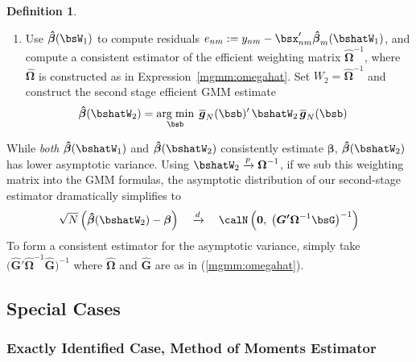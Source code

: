 \documentclass[12pt]{article}
\theoremstyle{plain}
\theoremstyle{definition}
\newtheorem{defn}[thm]{Definition}
\theoremstyle{remark}
\newcommand{\bsbeta}{\boldsymbol{\beta}}
\newcommand{\bshatG}{\boldsymbol{\hat{G}}}
\newcommand{\bsOmega}{\boldsymbol{\Omega}}
\newcommand{\bshatbeta}{\boldsymbol{\hat{\beta}}}
\newcommand{\bshatOmega}{\boldsymbol{\hat{\Omega}}}
\newcommand{\bsbarg}{\boldsymbol{\overline{g}}}
\renewcommand{\bso}{\boldsymbol{0}}
\newcommand{\bsGp}{\boldsymbol{G'}}
\DeclareMathOperator*{\argmin}{arg\;min}
\newcommand{\pto}{\xrightarrow{p}}
\newcommand{\dto}{\xrightarrow{d}}
\newcommand{\sumnN}{\sum^N_{n=1}}
\begin{document}
\begin{defn}
\begin{enumerate}[label=(\roman*)]
  \item Use $\bshatbeta(\bsW_1)$ to compute residuals
    $e_{nm} := y_{nm} - \bsx_{nm}'\bshatbeta_m(\bshatW_1)$,
    and compute a consistent estimator of the efficient weighting matrix
    $\bshatOmega^{-1}$, where $\bshatOmega$ is
    constructed as in Expression~\ref{mgmm:omegahat}.
    Set $W_2=\bshatOmega^{-1}$ and construct the second stage efficient
    GMM estimate
    \begin{alignat*}{3}
      \bshatbeta(\bshatW_2) &=
      \argmin_{\bsb}\;
      \bsbarg_N(\bsb)' \, \bshatW_2 \, \bsbarg_N(\bsb)
    \end{alignat*}
\end{enumerate}
While \emph{both} $\bshatbeta(\bshatW_1)$ and $\bshatbeta(\bshatW_2)$
consistently estimate $\bsbeta$, $\bshatbeta(\bshatW_2)$ has lower
asymptotic variance.
Using $\bshatW_2\pto \bsOmega^{-1}$,
if we sub this weighting matrix into the GMM formulas, the
asymptotic distribution of our second-stage estimator dramatically
simplifies to
\begin{align*}
  \sqrt{N}\left(\bshatbeta(\bshatW_2) - \bsbeta\right)
  \quad \dto \quad
  \calN\left(
    \bso,\;
    \big(
    \bsGp
    \bsOmega^{-1}
    \bsG
    \big)^{-1}
  \right)
\end{align*}
To form a consistent estimator for the asymptotic variance, simply
take $\big(\bshatG'\bshatOmega^{-1}\bshatG\big)^{-1}$ where
$\bshatOmega$ and $\bshatG$ are as in (\ref{mgmm:omegahat}).
\end{defn}

\clearpage
\subsection{Special Cases}

\subsubsection{Exactly Identified Case, Method of Moments Estimator}
\end{document}
